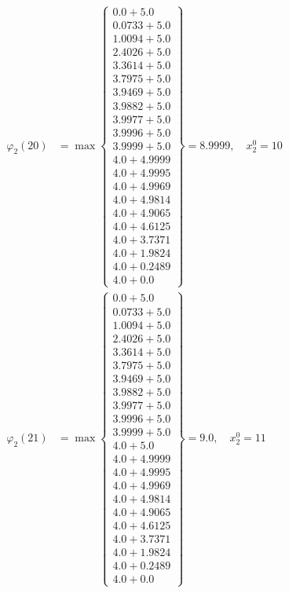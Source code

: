 \documentclass{article}
\begin{document}
\begin{align*}
\varphi_{2}(20) &= \max \left\{ \begin{array}{c}
0.0 + 5.0 \\
 0.0733 + 5.0 \\
 1.0094 + 5.0 \\
 2.4026 + 5.0 \\
 3.3614 + 5.0 \\
 3.7975 + 5.0 \\
 3.9469 + 5.0 \\
 3.9882 + 5.0 \\
 3.9977 + 5.0 \\
 3.9996 + 5.0 \\
 3.9999 + 5.0 \\
 4.0 + 4.9999 \\
 4.0 + 4.9995 \\
 4.0 + 4.9969 \\
 4.0 + 4.9814 \\
 4.0 + 4.9065 \\
 4.0 + 4.6125 \\
 4.0 + 3.7371 \\
 4.0 + 1.9824 \\
 4.0 + 0.2489 \\
 4.0 + 0.0
\end{array} \right\}=8.9999, \quad x_{2}^0=10\\
  
\varphi_{2}(21) &= \max \left\{ \begin{array}{c}
0.0 + 5.0 \\
 0.0733 + 5.0 \\
 1.0094 + 5.0 \\
 2.4026 + 5.0 \\
 3.3614 + 5.0 \\
 3.7975 + 5.0 \\
 3.9469 + 5.0 \\
 3.9882 + 5.0 \\
 3.9977 + 5.0 \\
 3.9996 + 5.0 \\
 3.9999 + 5.0 \\
 4.0 + 5.0 \\
 4.0 + 4.9999 \\
 4.0 + 4.9995 \\
 4.0 + 4.9969 \\
 4.0 + 4.9814 \\
 4.0 + 4.9065 \\
 4.0 + 4.6125 \\
 4.0 + 3.7371 \\
 4.0 + 1.9824 \\
 4.0 + 0.2489 \\
 4.0 + 0.0
\end{array} \right\}=9.0, \quad x_{2}^0=11\\
  

\end{align*}
\end{document}
